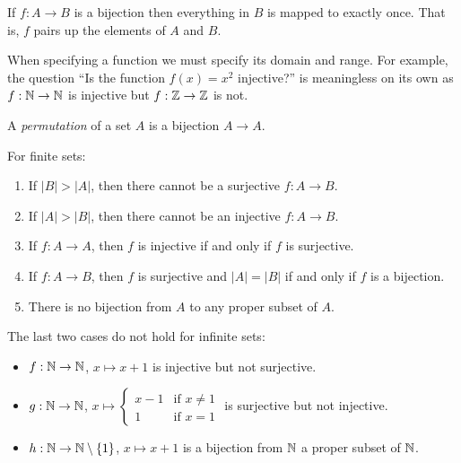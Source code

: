 \documentclass[../main.tex]{subfiles}
\begin{document}
If $f: A \to B$ is a bijection then everything in $B$ is mapped to exactly once. That is, $f$ pairs up the elements of $A$ and $B$.
\begin{remark}[Warning]
  When specifying a function we must specify its domain and range.
  For example, the question ``Is the function $f(x) = x^2$ injective?'' is meaningless on its own as $f: \mathbb{N} \to \mathbb{N}$ is injective but $f: \mathbb{Z} \to \mathbb{Z}$ is not.
\end{remark}
\begin{definition}[Permutation]
 A \textit{permutation} of a set $A$ is a bijection $A \to A$.
\end{definition}
\begin{remark}[Remarks]
  For finite sets:
  \begin{enumerate}
    \item If $|B| > |A|$, then there cannot be a surjective $f: A \to B$.
    \item If $|A| > |B|$, then there cannot be an injective $f: A \to B$.
    \item If $f: A \to A$, then $f$ is injective if and only if $f$ is surjective.
    \item If $f: A \to B$, then $f$ is surjective and $|A| = |B|$ if and only if $f$ is a bijection.
    \item There is no bijection from $A$ to any proper subset of $A$.
  \end{enumerate}
\end{remark}
\begin{remark}[Warning]
  The last two cases do not hold for infinite sets:
  \begin{itemize}
    \item $f: \mathbb{N} \to \mathbb{N}$, $x \mapsto x + 1$ is injective but not surjective.
    \item $g: \mathbb{N} \to \mathbb{N}$, $x \mapsto \begin{cases}
    x-1 & \text{if }x\neq1 \\
    1 & \text{if }x=1
    \end{cases}$ is surjective but not injective.
  \item $h: \mathbb{N} \to \mathbb{N} \setminus \{1\}$, $x \mapsto x + 1$ is a bijection from $\mathbb{N}$ a proper subset of $\mathbb{N}$.
  \end{itemize}
\end{remark}
\end{document}
